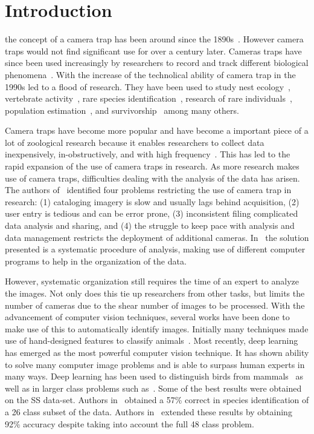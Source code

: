 \documentclass[journal]{IEEEtran}
\begin{document}
\section{Introduction}


 the concept of a camera trap has been around since the 1890s~\cite{harris2010automatic}. However camera traps would not find significant use for over a century later. Cameras traps have since been used increasingly by researchers to record and track different biological phenomena~\cite{o2010camera}. With the increase of the technolical ability of camera trap in the 1990s led to a flood of research. They have been used to study nest ecology~\cite{major1994inexpensive}, vertebrate activity~\cite{carthew1991monitoring}, rare species identification~\cite{surridge1999striped}, research of rare individuals~\cite{martyr1997important}, population estimation~\cite{o2006estimating}, and survivorship~\cite{karanth2006assessing} among many others. 

Camera traps have become more popular and have become a important piece of a lot of zoological research because it enables researchers to collect data inexpensively, in-obstructively, and with high frequency~\cite{o2010camera}. This has led to the rapid expansion of the use of camera traps in research. As more research makes use of camera traps, difficulties dealing with the analysis of the data has arisen. The authors of~\cite{harris2010automatic} identified four problems restricting the use of camera trap in research: (1) cataloging imagery is slow and usually lags behind acquisition, (2) user entry is tedious and can be error prone, (3) inconsistent filing complicated data analysis and sharing, and (4) the struggle to keep pace with analysis and data management restricts the deployment of additional cameras. In~\cite{harris2010automatic} the solution presented is a systematic procedure of analysis, making use of different computer programs to help in the organization of the data. 

However, systematic organization still requires the time of an expert to analyze the images. Not only does this tie up researchers from other tasks, but limits the number of cameras due to the shear number of images to be processed. With the advancement of computer vision techniques, several works have been done to make use of this to automatically identify images. Initially many techniques made use of hand-designed features to classify animals~\cite{swinnen2014novel}. Most recently, deep learning has emerged as the most powerful computer vision technique. It has shown ability to solve many computer image problems and is able to surpass human experts in many ways.  Deep learning has been used to distinguish birds from mammals~\cite{gomez2016animal} as well as in larger class problems such as~\cite{chen2014deep}. Some of the best results were obtained on the SS data-set. Authors in~\cite{villa2017towards} obtained a 57\% correct in species identification of a 26 class subset of the data. Authors in~\cite{norouzzadeh2018automatically} extended these results by obtaining 92\% accuracy despite taking into account the full 48 class problem. 
\end{document}
